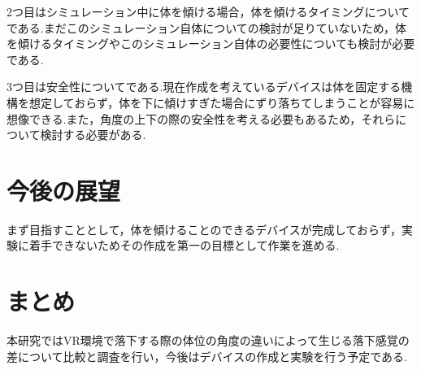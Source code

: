 \documentclass[uplatex]{jsarticle}
\begin{document}
2つ目はシミュレーション中に体を傾ける場合，体を傾けるタイミングについてである.まだこのシミュレーション自体についての検討が足りていないため，体を傾けるタイミングやこのシミュレーション自体の必要性についても検討が必要である.

3つ目は安全性についてである.現在作成を考えているデバイスは体を固定する機構を想定しておらず，体を下に傾けすぎた場合にずり落ちてしまうことが容易に想像できる.また，角度の上下の際の安全性を考える必要もあるため，それらについて検討する必要がある.

\section{今後の展望}
まず目指すこととして，体を傾けることのできるデバイスが完成しておらず，実験に着手できないためその作成を第一の目標として作業を進める.

\section{まとめ}
本研究ではVR環境で落下する際の体位の角度の違いによって生じる落下感覚の差について比較と調査を行い，今後はデバイスの作成と実験を行う予定である.


 
\end{document}
